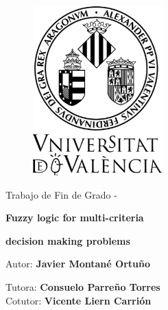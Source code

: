 \begin{titlepage}

    \begin{center}
    \vspace*{-1in}
    \begin{figure}[H]
    \begin{center}
    \includegraphics[width=5cm]{Escut.png}
    \end{center}
    \end{figure}
    
    \vspace*{0.5in}
    
    \begin{Huge}
    Trabajo de Fin de Grado - \@date
    
    \vspace*{0.5in}
    
    \textbf{Fuzzy logic for multi-criteria}
    
    \textbf{decision making problems}\\
    \end{Huge}
    
    \vspace*{0.1in}
    
    
    \vspace*{0.2in}
    
    \begin{huge}
    Autor: {\bf
    Javier Montané Ortuño} \\
    \end{huge}
    
    \vspace*{0.2in}
    
    \begin{Large}
    Tutora: {\bf \sc
    Consuelo Parreño Torres} \\
    Cotutor: {\bf \sc
    Vicente Liern Carrión} \\
    \end{Large}
    

\end{center}
\end{titlepage}
